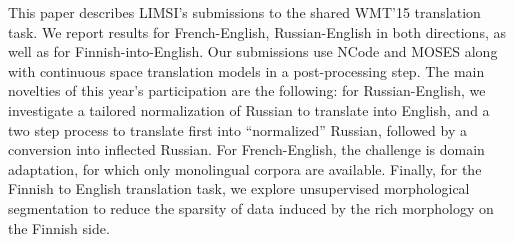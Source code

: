 This paper describes LIMSI's submissions to the shared WMT'15 translation task. We report results for French-English, Russian-English in both directions, as well as for Finnish-into-English. Our submissions use NCode and MOSES along with continuous space translation models in a post-processing step. The main novelties of this year's participation are the following: for Russian-English, we investigate a tailored normalization of Russian to translate into English, and a two step process to  translate first into ``normalized'' Russian, followed by a conversion into inflected Russian. For French-English, the challenge is domain adaptation, for which only monolingual corpora are available. Finally, for the Finnish to English translation task, we explore unsupervised morphological segmentation to reduce the sparsity of data induced by the rich morphology on the Finnish side.
